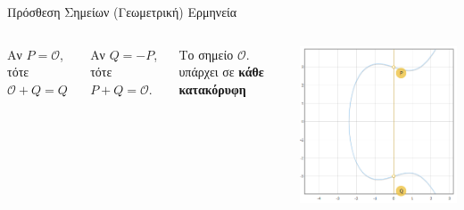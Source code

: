 \documentclass[handout]{beamer}
\begin{document}
\begin{frame}[allowframebreaks]{Πρόσθεση Σημείων}
(Γεωμετρική) Ερμηνεία

\begin{columns}
Αν $P=\mathcal O$, τότε $\mathcal O+Q=Q$  

Αν $Q=-P$, τότε  $P+Q=\mathcal O$.  

Το σημείο $\mathcal O$. υπάρχει σε \textbf{κάθε κατακόρυφη}
\begin{center}
\includegraphics[scale=0.5]{add_opp.png} 
\end{center}

\end{columns}



\end{frame}
\end{document}
